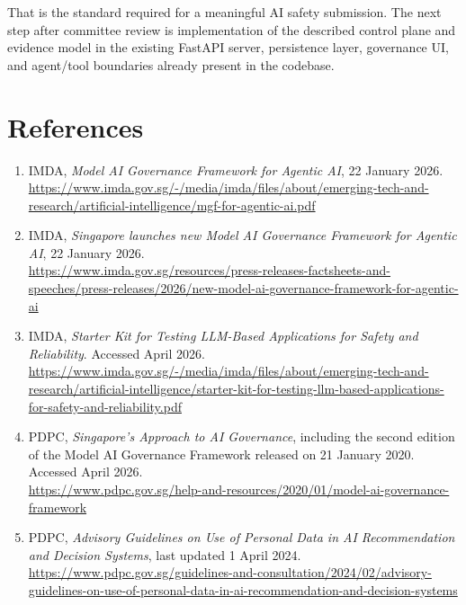\documentclass[11pt,a4paper]{article}
\begin{document}
That is the standard required for a meaningful AI safety submission. The next step after committee review is implementation of the described control plane and evidence model in the existing FastAPI server, persistence layer, governance UI, and agent/tool boundaries already present in the codebase.

\section{References}
\label{sec:references}

\begin{enumerate}[leftmargin=1.2cm]
    \item IMDA, \emph{Model AI Governance Framework for Agentic AI}, 22 January 2026.\\
    \url{https://www.imda.gov.sg/-/media/imda/files/about/emerging-tech-and-research/artificial-intelligence/mgf-for-agentic-ai.pdf}

    \item IMDA, \emph{Singapore launches new Model AI Governance Framework for Agentic AI}, 22 January 2026.\\
    \url{https://www.imda.gov.sg/resources/press-releases-factsheets-and-speeches/press-releases/2026/new-model-ai-governance-framework-for-agentic-ai}

    \item IMDA, \emph{Starter Kit for Testing LLM-Based Applications for Safety and Reliability}. Accessed April 2026.\\
    \url{https://www.imda.gov.sg/-/media/imda/files/about/emerging-tech-and-research/artificial-intelligence/starter-kit-for-testing-llm-based-applications-for-safety-and-reliability.pdf}

    \item PDPC, \emph{Singapore's Approach to AI Governance}, including the second edition of the Model AI Governance Framework released on 21 January 2020. Accessed April 2026.\\
    \url{https://www.pdpc.gov.sg/help-and-resources/2020/01/model-ai-governance-framework}

    \item PDPC, \emph{Advisory Guidelines on Use of Personal Data in AI Recommendation and Decision Systems}, last updated 1 April 2024.\\
    \url{https://www.pdpc.gov.sg/guidelines-and-consultation/2024/02/advisory-guidelines-on-use-of-personal-data-in-ai-recommendation-and-decision-systems}


\end{enumerate}
\end{document}
